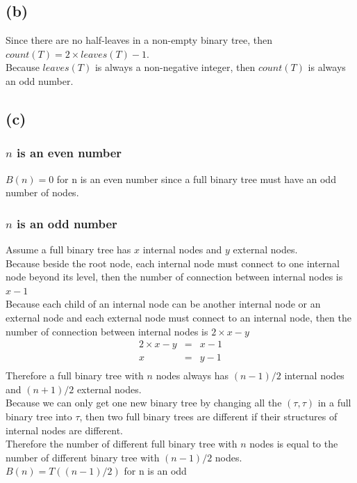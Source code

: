 \documentclass{article} %
\begin{document}
\subsection*{(b)}
Since there are no half-leaves in a non-empty binary tree, then $count(T) = 2 \times leaves(T) -1$.\\
Because $leaves(T)$ is always a non-negative integer, then $count(T)$ is always an odd number.\\
\subsection*{(c)}
\subsubsection*{$n$ is an even number}
$B(n)= 0$ for n is an even number since a full binary tree must have an odd number of nodes.\\
\subsubsection*{$n$ is an odd number}
Assume a full binary tree has $x$ internal nodes and $y$ external nodes.\\
Because beside the root node, each internal node must connect to one internal node beyond its level, then the number of connection between internal nodes is $x - 1$\\
Because each child of an internal node can be another internal node or an external node and each external node must connect to an internal node, then the number of connection between internal nodes is $2 \times x - y$\\
\[\begin{array}{rcl}
    2\times x - y   &=& x - 1\\
                x   &=& y - 1\\
\end{array}\]
Therefore a full binary tree with $n$ nodes always has $(n-1)/2$ internal nodes and $(n+1)/2$ external nodes.\\
Because we can only get one new binary tree by changing all the $(\tau, \tau)$ in a full binary tree into $\tau$, then two full binary trees are different if their structures of internal nodes are different.\\
Therefore the number of different full binary tree with $n$ nodes is equal to the number of different binary tree with $(n-1)/2$ nodes.\\
$B(n) = T((n - 1)/2)$ for n is an odd\\
\end{document}
